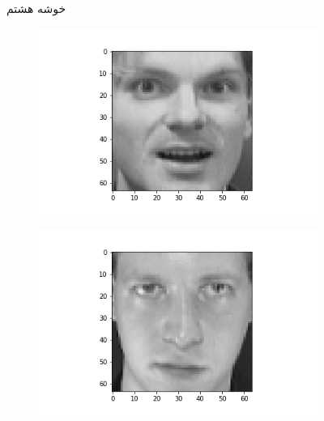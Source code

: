 \documentclass[12pt, a4paper]{article}
\begin{document}
\begin{figure}[h]
\begin{subfigure}{0.3\linewidth}
    \end{subfigure}
    \caption{خوشه هشتم}
\end{figure}

\clearpage

\begin{figure}[h]
    \begin{subfigure}{0.3\linewidth}
        \centering
        \includegraphics[width=\linewidth]{images/q3/c/8/0.png}
    \end{subfigure}
    \hfill
    \begin{subfigure}{0.3\linewidth}
        \centering
        \includegraphics[width=\linewidth]{images/q3/c/8/1.png}
    \end{subfigure}
    \hfill
    \begin{subfigure}{0.3\linewidth}
        \centering

\end{subfigure}
\end{figure}
\end{document}

